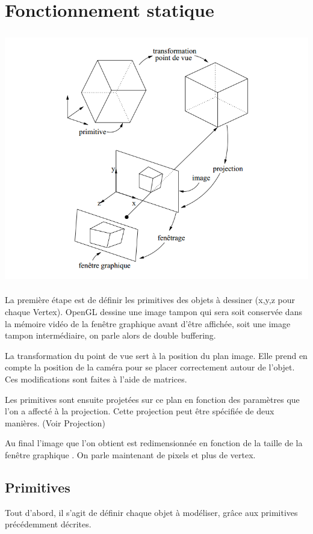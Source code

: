 \section{Fonctionnement statique}
\begin{center}
	 \includegraphics[height=11cm]{img/Fonctionnement}
 \end{center}

La première étape est de définir les primitives des objets à dessiner (x,y,z pour chaque Vertex).
OpenGL dessine une image tampon qui sera soit conservée dans la mémoire vidéo de la fenêtre graphique avant d’être affichée, soit une image tampon intermédiaire, on parle alors de double buffering.

La transformation du point de vue sert à la position du plan image. Elle prend en compte la position de la caméra pour se placer correctement autour de l'objet. Ces modifications sont faites à l'aide de matrices. 

Les primitives sont ensuite projetées sur ce plan en fonction des paramètres que l’on a affecté à la projection. Cette projection peut être spécifiée de deux manières. (Voir Projection)

Au final l’image que l’on obtient est redimensionnée en fonction de la taille de la fenêtre graphique . On parle maintenant de pixels et plus de vertex.
\newpage

\subsection{Primitives}
Tout d'abord, il s'agit de définir chaque objet à modéliser, grâce aux primitives précédemment décrites.

